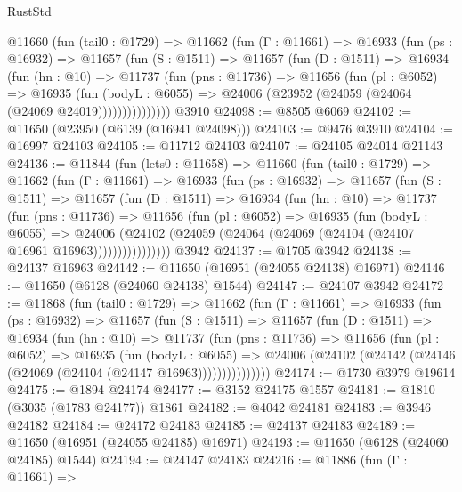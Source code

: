 \begin{lexlean}{RustStd}
\begin{coremodule}
      @11660
        (fun (tail0 : @1729) =>
        @11662
          (fun (Γ : @11661) =>
          @16933
            (fun (ps : @16932) =>
            @11657
              (fun (S : @1511) =>
              @11657
                (fun (D : @1511) =>
                @16934
                  (fun (hn : @10) =>
                  @11737
                    (fun (pns : @11736) =>
                    @11656
                      (fun (pl : @6052) =>
                      @16935
                        (fun (bodyL : @6055) =>
                        @24006 (@23952 (@24059 (@24064 (@24069 @24019)))))))))))))))
    @3910
@24098 := @8505 @6069
@24102 := @11650 (@23950 (@6139 (@16941 @24098)))
@24103 := @9476 @3910
@24104 := @16997 @24103
@24105 := @11712 @24103
@24107 := @24105 @24014 @21143
@24136 := @11844
    (fun (lets0 : @11658) =>
    @11660
      (fun (tail0 : @1729) =>
      @11662
        (fun (Γ : @11661) =>
        @16933
          (fun (ps : @16932) =>
          @11657
            (fun (S : @1511) =>
            @11657
              (fun (D : @1511) =>
              @16934
                (fun (hn : @10) =>
                @11737
                  (fun (pns : @11736) =>
                  @11656
                    (fun (pl : @6052) =>
                    @16935
                      (fun (bodyL : @6055) =>
                      @24006
                        (@24102
                          (@24059 (@24064 (@24069 (@24104 (@24107 @16961 @16963))))))))))))))))
    @3942
@24137 := @1705 @3942
@24138 := @24137 @16963
@24142 := @11650 (@16951 (@24055 @24138) @16971)
@24146 := @11650 (@6128 (@24060 @24138) @1544)
@24147 := @24107 @3942
@24172 := @11868
    (fun (tail0 : @1729) =>
    @11662
      (fun (Γ : @11661) =>
      @16933
        (fun (ps : @16932) =>
        @11657
          (fun (S : @1511) =>
          @11657
            (fun (D : @1511) =>
            @16934
              (fun (hn : @10) =>
              @11737
                (fun (pns : @11736) =>
                @11656
                  (fun (pl : @6052) =>
                  @16935
                    (fun (bodyL : @6055) =>
                    @24006 (@24102 (@24142 (@24146 (@24069 (@24104 (@24147 @16963)))))))))))))))
@24174 := @1730 @3979 @19614
@24175 := @1894 @24174
@24177 := @3152 @24175 @1557
@24181 := @1810 (@3035 (@1783 @24177)) @1861
@24182 := @4042 @24181
@24183 := @3946 @24182
@24184 := @24172 @24183
@24185 := @24137 @24183
@24189 := @11650 (@16951 (@24055 @24185) @16971)
@24193 := @11650 (@6128 (@24060 @24185) @1544)
@24194 := @24147 @24183
@24216 := @11886
    (fun (Γ : @11661) =>

\end{coremodule}
\end{lexlean}
